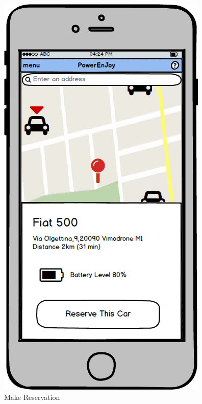 \documentclass[a4paper,11pt]{article}
\begin{document}
\begin{itemize}
\begin{figure}[H]
\begin{minipage}[t]{.35\linewidth}
    \includegraphics[width=\textwidth]{images/make}  
  \caption{Make Reservation}\label{fig-make}
  \end{minipage}
  \begin{minipage}[t]{.35\linewidth}

\end{minipage}
\end{figure}
\end{itemize}
\end{document}
